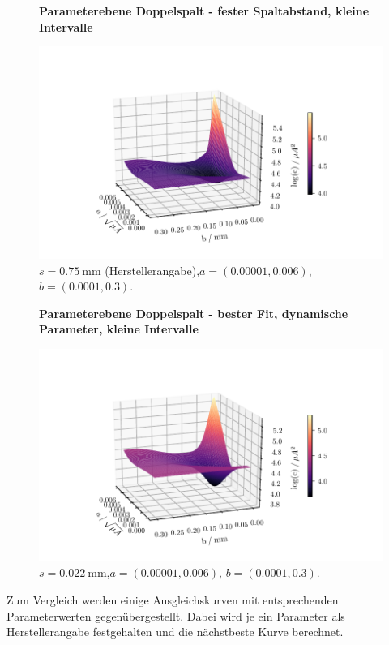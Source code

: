 \begin{figure}
    \centering
    \textbf{Parameterebene Doppelspalt - fester Spaltabstand, kleine Intervalle}\par\medskip
    \includegraphics[width=.9\textwidth]{python/leastSquaresDoppel3ss.pdf}
    \caption{$s = \SI{0.75}{\milli\meter}$ (Herstellerangabe),$a = (0.00001, 0.006)$, $b = (0.0001, 0.3)$.}
    \label{fig:lsd3ss}
\end{figure}
\begin{figure}
    \centering
    \textbf{Parameterebene Doppelspalt - bester Fit, dynamische Parameter, kleine Intervalle}\par\medskip
    \includegraphics[width=.9\textwidth]{python/leastSquaresDoppel3s.pdf}
    \caption{$s = \SI{0.022}{\milli\meter}$,$a = (0.00001, 0.006)$, $b = (0.0001, 0.3)$.}
    \label{fig:lsd3s}
\end{figure}

Zum Vergleich werden einige Ausgleichskurven mit entsprechenden Parameterwerten gegenübergestellt. Dabei wird je ein Parameter als Herstellerangabe
festgehalten und die nächstbeste Kurve berechnet.

